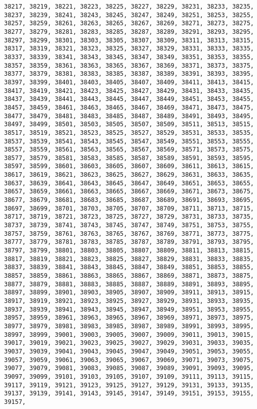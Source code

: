 \documentclass[11pt]{article}
\begin{document}
\begin{Verbatim}[commandchars=\\\{\}]
38217, 38219, 38221, 38223, 38225, 38227, 38229, 38231, 38233, 38235, 38237, 38239, 38241, 38243, 38245, 38247, 38249, 38251, 38253, 38255, 38257, 38259, 38261, 38263, 38265, 38267, 38269, 38271, 38273, 38275, 38277, 38279, 38281, 38283, 38285, 38287, 38289, 38291, 38293, 38295, 38297, 38299, 38301, 38303, 38305, 38307, 38309, 38311, 38313, 38315, 38317, 38319, 38321, 38323, 38325, 38327, 38329, 38331, 38333, 38335, 38337, 38339, 38341, 38343, 38345, 38347, 38349, 38351, 38353, 38355, 38357, 38359, 38361, 38363, 38365, 38367, 38369, 38371, 38373, 38375, 38377, 38379, 38381, 38383, 38385, 38387, 38389, 38391, 38393, 38395, 38397, 38399, 38401, 38403, 38405, 38407, 38409, 38411, 38413, 38415, 38417, 38419, 38421, 38423, 38425, 38427, 38429, 38431, 38433, 38435, 38437, 38439, 38441, 38443, 38445, 38447, 38449, 38451, 38453, 38455, 38457, 38459, 38461, 38463, 38465, 38467, 38469, 38471, 38473, 38475, 38477, 38479, 38481, 38483, 38485, 38487, 38489, 38491, 38493, 38495, 38497, 38499, 38501, 38503, 38505, 38507, 38509, 38511, 38513, 38515, 38517, 38519, 38521, 38523, 38525, 38527, 38529, 38531, 38533, 38535, 38537, 38539, 38541, 38543, 38545, 38547, 38549, 38551, 38553, 38555, 38557, 38559, 38561, 38563, 38565, 38567, 38569, 38571, 38573, 38575, 38577, 38579, 38581, 38583, 38585, 38587, 38589, 38591, 38593, 38595, 38597, 38599, 38601, 38603, 38605, 38607, 38609, 38611, 38613, 38615, 38617, 38619, 38621, 38623, 38625, 38627, 38629, 38631, 38633, 38635, 38637, 38639, 38641, 38643, 38645, 38647, 38649, 38651, 38653, 38655, 38657, 38659, 38661, 38663, 38665, 38667, 38669, 38671, 38673, 38675, 38677, 38679, 38681, 38683, 38685, 38687, 38689, 38691, 38693, 38695, 38697, 38699, 38701, 38703, 38705, 38707, 38709, 38711, 38713, 38715, 38717, 38719, 38721, 38723, 38725, 38727, 38729, 38731, 38733, 38735, 38737, 38739, 38741, 38743, 38745, 38747, 38749, 38751, 38753, 38755, 38757, 38759, 38761, 38763, 38765, 38767, 38769, 38771, 38773, 38775, 38777, 38779, 38781, 38783, 38785, 38787, 38789, 38791, 38793, 38795, 38797, 38799, 38801, 38803, 38805, 38807, 38809, 38811, 38813, 38815, 38817, 38819, 38821, 38823, 38825, 38827, 38829, 38831, 38833, 38835, 38837, 38839, 38841, 38843, 38845, 38847, 38849, 38851, 38853, 38855, 38857, 38859, 38861, 38863, 38865, 38867, 38869, 38871, 38873, 38875, 38877, 38879, 38881, 38883, 38885, 38887, 38889, 38891, 38893, 38895, 38897, 38899, 38901, 38903, 38905, 38907, 38909, 38911, 38913, 38915, 38917, 38919, 38921, 38923, 38925, 38927, 38929, 38931, 38933, 38935, 38937, 38939, 38941, 38943, 38945, 38947, 38949, 38951, 38953, 38955, 38957, 38959, 38961, 38963, 38965, 38967, 38969, 38971, 38973, 38975, 38977, 38979, 38981, 38983, 38985, 38987, 38989, 38991, 38993, 38995, 38997, 38999, 39001, 39003, 39005, 39007, 39009, 39011, 39013, 39015, 39017, 39019, 39021, 39023, 39025, 39027, 39029, 39031, 39033, 39035, 39037, 39039, 39041, 39043, 39045, 39047, 39049, 39051, 39053, 39055, 39057, 39059, 39061, 39063, 39065, 39067, 39069, 39071, 39073, 39075, 39077, 39079, 39081, 39083, 39085, 39087, 39089, 39091, 39093, 39095, 39097, 39099, 39101, 39103, 39105, 39107, 39109, 39111, 39113, 39115, 39117, 39119, 39121, 39123, 39125, 39127, 39129, 39131, 39133, 39135, 39137, 39139, 39141, 39143, 39145, 39147, 39149, 39151, 39153, 39155, 39157, 
\end{Verbatim}
\end{document}
